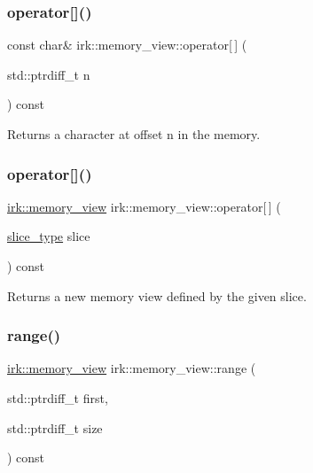 \subsubsection{\texorpdfstring{operator[]()}{operator[]()}\hspace{0.1cm}{\footnotesize\ttfamily [1/2]}}
{\footnotesize\ttfamily const char\& irk\+::memory\+\_\+view\+::operator\mbox{[}$\,$\mbox{]} (\begin{DoxyParamCaption}\item[{std\+::ptrdiff\+\_\+t}]{n }\end{DoxyParamCaption}) const\hspace{0.3cm}{\ttfamily [inline]}}



Returns a character at offset {\ttfamily n} in the memory. 

\mbox{\label{classirk_1_1memory__view_ae16ba32b9419a8918762132186a00463}} 
\subsubsection{\texorpdfstring{operator[]()}{operator[]()}\hspace{0.1cm}{\footnotesize\ttfamily [2/2]}}
{\footnotesize\ttfamily \mbox{\hyperlink{classirk_1_1memory__view}{irk\+::memory\+\_\+view}} irk\+::memory\+\_\+view\+::operator\mbox{[}$\,$\mbox{]} (\begin{DoxyParamCaption}\item[{\mbox{\hyperlink{classirk_1_1memory__view_ac0c1d9600bf81e8cb861a89ab104a43c}{slice\+\_\+type}}}]{slice }\end{DoxyParamCaption}) const\hspace{0.3cm}{\ttfamily [inline]}}



Returns a new memory view defined by the given slice. 

\mbox{\label{classirk_1_1memory__view_a5edb4d5f580fdcc20f131e8980d1f7aa}} 
\subsubsection{\texorpdfstring{range()}{range()}}
{\footnotesize\ttfamily \mbox{\hyperlink{classirk_1_1memory__view}{irk\+::memory\+\_\+view}} irk\+::memory\+\_\+view\+::range (\begin{DoxyParamCaption}\item[{std\+::ptrdiff\+\_\+t}]{first,  }\item[{std\+::ptrdiff\+\_\+t}]{size }\end{DoxyParamCaption}) const\hspace{0.3cm}{\ttfamily [inline]}}



